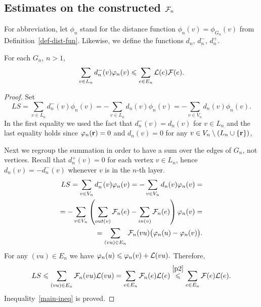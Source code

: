 \documentclass[12pt,oneside,a4paper]{amsart}
\begin{document}
        \medskip
        \subsection{Estimates on the constructed \texorpdfstring{$\mathcal{F}_{n}$}{Fn}}
          For abbreviation, let $\phi_n$ stand for the distance function $\phi_n(v) = \phi_{G_n}(v)$
            from Definition~\ref{def-dist-fun}.
          Likewise, we define the functions $d_n$, $d^{-}_n$, $d^{+}_n$.
          \begin{lemma}
            For each $G_n$, $n > 1$,
            \begin{equation}
              \label{main-ineq}
              \sum_{v\in L_n}d_{n}^{-}(v) \varphi_n(v) \leqslant \sum_{e \in E_n} \mathcal{L}(e) \mathcal{F}(e).
            \end{equation}
          \end{lemma}
          \begin{proof}
            Set
            \[
              LS = \sum_{v \in L_n} d_n^{-}(v) \phi_n(v) =
                  -\sum_{v \in L_n} d_n(v) \phi_n(v) =
                  -\sum_{v \in V_n} d_n(v) \phi_n(v).
            \]
            In the first equality we used the fact that $d_n^{-}(v) = d_n(v)$ for $v \in L_n$ and
              the last equality holds since $\varphi_n(\mathbf{r}) = 0$ and $d_n(v) = 0$
              for any $v \in V_{n} \setminus \left(L_n \cup \{\mathbf{r}\}\right)$,

            Next we regroup the summation in order to have a sum over the edges of $G_n$, not vertices.
            Recall that $d_n^{+}(v) = 0$ for each vertex $v \in L_n$,
              hence $d_n(v) = -d_n^{-}(v)$ whenever $v$ is in the $n$-th layer.
            \begin{align*}
              LS = \sum_{v \in V_n} d_n^{-}(v) \varphi_n(v) = -\sum\limits_{v \in V_n} d_n(v) \varphi_n(v) =\\
              =-\sum_{v \in V_n} \left(\sum_{out(v)} \mathcal{F}_{n}(e) - \sum_{in(v)}\mathcal{F}_{n}(e) \right) \varphi_n(v)=\\
              =\sum_{(vu) \in E_n} \mathcal{F}_{n}(vu) \big(\varphi_n(u) - \varphi_n(v)\big).
            \end{align*}
            For any $(vu) \in E_n$ we have $\varphi_n(u) \leqslant \varphi_n(v) + \mathcal{L}(vu).$
            Therefore,
            \[
              LS\leqslant\sum_{(vu) \in E_n} \mathcal{F}_{n}(vu) \mathcal{L}(vu)= \sum_{e \in E_n} \mathcal{F}_{n}(e) \mathcal{L}(e) \overset{\ref{p2}}{\leqslant} \sum_{e \in E_n} \mathcal{F}(e) \mathcal{L}(e).
            \]
            Inequality~\eqref{main-ineq} is proved.
          \end{proof}
\end{document}
